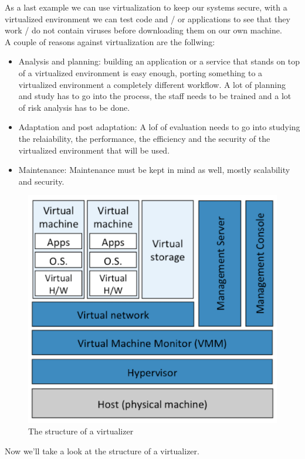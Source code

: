 As a last example we can use virtualization to keep our systems secure, with a virtualized environment we can test code and / or applications to see that they work / do not contain viruses before downloading them on our own machine. \\
A couple of reasons against virtualization are the follwing:
\begin{itemize}
    \item Analysis and planning: building an application or a service that stands on top of a virtualized environment is easy enough, porting something to a virtualized environment a completely different workflow. A lot of planning and study has to go into the process, the staff needs to be trained and a lot of risk analysis has to be done.
    \item Adaptation and post adaptation: A lof of evaluation needs to go into studying the relaiability, the performance, the efficiency and the security of the virtualized environment that will be used.
    \item Maintenance: Maintenance must be kept in mind as well, mostly scalability and security.
\end{itemize}
\begin{figure}
    \centering
    \includegraphics[scale=0.4]{./Images/virtualization_components.png}
    \caption{The structure of a virtualizer}
\end{figure}
Now we'll take a look at the structure of a virtualizer. \\
